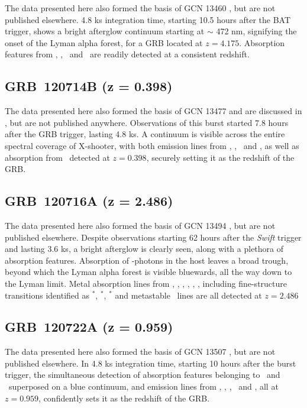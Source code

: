 \documentclass[longauth]{aa}    %
\begin{document}
The data presented here also formed the basis of GCN 13460 \citep{GCN13460}, but
are not published elsewhere. 4.8 ks integration time, starting 10.5 hours after
the BAT trigger, shows a bright afterglow continuum starting at $\sim$ 472 nm,
signifying the onset of the Lyman alpha forest, for a GRB located at $z =
4.175$. Absorption features from \lya, \feii, \mgii~and \SIii~are readily
detected at a consistent redshift.

\subsection{GRB~120714B (z = 0.398)} \label{120714}

The data presented here also formed the basis of GCN 13477 \citep{GCN13477} and
are discussed in \citet{2018arXiv180802710K}, but are not published anywhere.
Observations of this burst started 7.8 hours after the GRB trigger, lasting 4.8
ks. A continuum is visible across the entire spectral coverage of X-shooter,
with both emission lines from  \oii, \hb, \oiii~and \ha, as well as absorption
from \mgii~detected at $z = 0.398$, securely setting it as the redshift of the
GRB.


\subsection{GRB~120716A (z = 2.486)} \label{120716}

The data presented here also formed the basis of GCN 13494 \citep{GCN13494}, but
are not published elsewhere. Despite observations starting 62 hours after the
\textit{Swift} trigger and lasting 3.6 ks, a bright afterglow is clearly seen,
along with a plethora of absorption features. Absorption of \lya-photons in the
host leaves a broad trough, beyond which the Lyman alpha forest is visible
bluewards, all the way down to the Lyman limit. Metal absorption lines from
\cii, \SIii, \oi, \feii, \civ, \SIiv, including fine-structure transitions
identified as \cii$^*$, \SIii$^*$, \feii$^*$ and metastable \NIii~lines are all
detected at $z = 2.486$


\subsection{GRB~120722A (z = 0.959)} \label{120722}

The data presented here also formed the basis of GCN 13507 \citep{GCN13507}, but
are not published elsewhere. In 4.8 ks integration time, starting 10 hours after
the burst trigger, the simultaneous detection of absorption features belonging
to \mgii~and \feii~superposed on a blue continuum, and emission lines from \oii,
\hg, \hb, \oiii~and \ha, all at $z = 0.959$, confidently sets it as the redshift
of the GRB.
\end{document}
